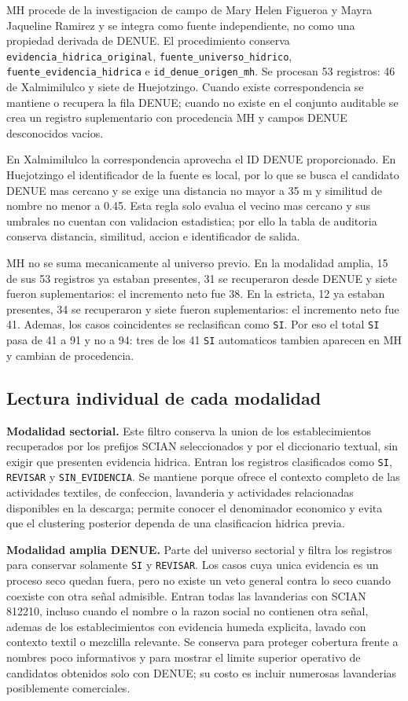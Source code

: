 \documentclass[11pt,letterpaper]{article}
\begin{document}
MH procede de la investigacion de campo de Mary Helen Figueroa y Mayra Jaqueline Ramirez y se integra como fuente independiente, no como una propiedad derivada de DENUE. El procedimiento conserva \texttt{evidencia\_hidrica\_original}, \texttt{fuente\_universo\_hidrico}, \texttt{fuente\_evidencia\_hidrica} e \texttt{id\_denue\_origen\_mh}. Se procesan 53 registros: 46 de Xalmimilulco y siete de Huejotzingo. Cuando existe correspondencia se mantiene o recupera la fila DENUE; cuando no existe en el conjunto auditable se crea un registro suplementario con procedencia MH y campos DENUE desconocidos vacios.

En Xalmimilulco la correspondencia aprovecha el ID DENUE proporcionado. En Huejotzingo el identificador de la fuente es local, por lo que se busca el candidato DENUE mas cercano y se exige una distancia no mayor a 35 m y similitud de nombre no menor a 0.45. Esta regla solo evalua el vecino mas cercano y sus umbrales no cuentan con validacion estadistica; por ello la tabla de auditoria conserva distancia, similitud, accion e identificador de salida.

MH no se suma mecanicamente al universo previo. En la modalidad amplia, 15 de sus 53 registros ya estaban presentes, 31 se recuperaron desde DENUE y siete fueron suplementarios: el incremento neto fue 38. En la estricta, 12 ya estaban presentes, 34 se recuperaron y siete fueron suplementarios: el incremento neto fue 41. Ademas, los casos coincidentes se reclasifican como \texttt{SI}. Por eso el total \texttt{SI} pasa de 41 a 91 y no a 94: tres de los 41 \texttt{SI} automaticos tambien aparecen en MH y cambian de procedencia.

\subsection{Lectura individual de cada modalidad}

\textbf{Modalidad sectorial.} Este filtro conserva la union de los establecimientos recuperados por los prefijos SCIAN seleccionados y por el diccionario textual, sin exigir que presenten evidencia hidrica. Entran los registros clasificados como \texttt{SI}, \texttt{REVISAR} y \texttt{SIN\_EVIDENCIA}. Se mantiene porque ofrece el contexto completo de las actividades textiles, de confeccion, lavanderia y actividades relacionadas disponibles en la descarga; permite conocer el denominador economico y evita que el clustering posterior dependa de una clasificacion hidrica previa.

\textbf{Modalidad amplia DENUE.} Parte del universo sectorial y filtra los registros para conservar solamente \texttt{SI} y \texttt{REVISAR}. Los casos cuya unica evidencia es un proceso seco quedan fuera, pero no existe un veto general contra lo seco cuando coexiste con otra señal admisible. Entran todas las lavanderias con SCIAN 812210, incluso cuando el nombre o la razon social no contienen otra señal, ademas de los establecimientos con evidencia humeda explicita, lavado con contexto textil o mezclilla relevante. Se conserva para proteger cobertura frente a nombres poco informativos y para mostrar el limite superior operativo de candidatos obtenidos solo con DENUE; su costo es incluir numerosas lavanderias posiblemente comerciales.
\end{document}
